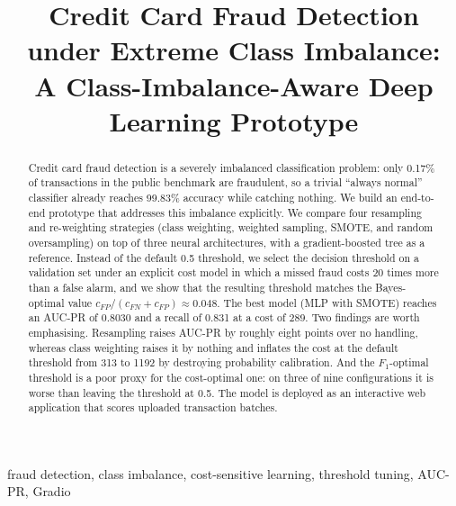 \documentclass[conference]{IEEEtran}
\begin{document}
\title{Credit Card Fraud Detection under Extreme Class Imbalance: \\
 A Class-Imbalance-Aware Deep Learning Prototype}

\author{
}

\maketitle

\begin{abstract}
Credit card fraud detection is a severely imbalanced classification problem:
only 0.17\% of transactions in the public benchmark are fraudulent, so a
trivial ``always normal'' classifier already reaches 99.83\% accuracy while
catching nothing. We build an end-to-end prototype that addresses this
imbalance explicitly. We compare four resampling and re-weighting strategies
(class weighting, weighted sampling, SMOTE, and random oversampling) on top of
three neural architectures, with a gradient-boosted tree as a reference.
Instead of the default 0.5 threshold, we select the decision threshold on a
validation set under an explicit cost model in which a missed fraud costs
20 times more than a false alarm, and we show that the resulting threshold
matches the Bayes-optimal value $c_{FP}/(c_{FN}+c_{FP})\approx0.048$. The best
model (MLP with SMOTE) reaches an AUC-PR of 0.8030 and a recall of 0.831 at a
cost of 289. Two findings are worth emphasising. Resampling raises AUC-PR by
roughly eight points over no handling, whereas class weighting raises it by
nothing and inflates the cost at the default threshold from 313 to 1192 by
destroying probability calibration. And the $F_1$-optimal threshold is a poor
proxy for the cost-optimal one: on three of nine configurations it is worse
than leaving the threshold at 0.5. The model is deployed as an interactive web
application that scores uploaded transaction batches.
\end{abstract}

\begin{IEEEkeywords}
fraud detection, class imbalance, cost-sensitive learning, threshold tuning,
AUC-PR, Gradio
\end{IEEEkeywords}
\end{document}

